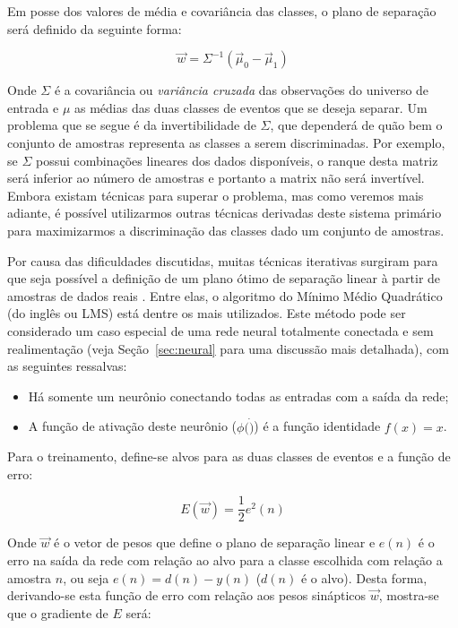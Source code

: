 Em posse dos valores de média e covariância das classes, o plano de separação
será definido da seguinte forma:

\begin{equation}
\overrightarrow{w} = \Sigma^{-1}(\overrightarrow{\mu}_0 -
\overrightarrow{\mu}_1) 
\end{equation}

Onde $\Sigma$ é a covariância ou \textit{variância cruzada} das observações do
universo de entrada e $\mu$ as médias das duas classes de eventos que se
deseja separar. Um problema que se segue é da invertibilidade de $\Sigma$, que
dependerá de quão bem o conjunto de amostras representa as classes a serem
discriminadas. Por exemplo, se $\Sigma$ possui combinações lineares dos dados
disponíveis, o ranque desta matriz será inferior ao número de amostras e
portanto a matrix não será invertível. Embora existam técnicas para superar o
problema, mas como veremos mais adiante, é possível utilizarmos outras
técnicas derivadas deste sistema primário para maximizarmos a discriminação
das classes dado um conjunto de amostras.

Por causa das dificuldades discutidas, muitas técnicas iterativas surgiram
para que seja possível a definição de um plano ótimo de separação linear à
partir de amostras de dados reais \cite{haykin}. Entre elas, o algoritmo do
Mínimo Médio Quadrático (do inglês  ou LMS) está dentre
os mais utilizados. Este método pode ser considerado um caso especial de uma
rede neural totalmente conectada e sem realimentação (veja
Seção~\ref{sec:neural} para uma discussão mais detalhada), com as seguintes
ressalvas:

\begin{itemize}
\item Há somente um neurônio conectando todas as entradas com a saída da rede;
\item A função de ativação deste neurônio ($\phi(\dot)$) é a função identidade
$f(x) = x$.
\end{itemize}

Para o treinamento, define-se alvos para as duas classes de eventos e a função
de erro:

\begin{equation}
E(\overrightarrow{w}) = \frac{1}{2} e^2(n)
\end{equation}

Onde $\overrightarrow{w}$ é o vetor de pesos que define o plano de separação
linear e $e(n)$ é o erro na saída da rede com relação ao alvo para a classe
escolhida com relação a amostra $n$, ou seja $e(n) = d(n)-y(n)$ ($d(n)$ é o
alvo). Desta forma, derivando-se esta função de erro com relação aos pesos
sinápticos $\overrightarrow{w}$, mostra-se que o gradiente de $E$ será:

